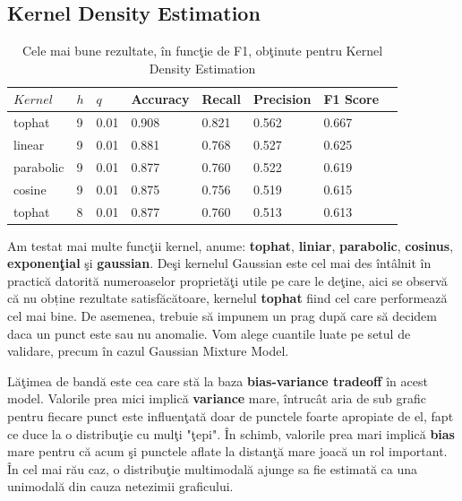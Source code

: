 \subsection{Kernel Density Estimation}

\begin{table}[H]
  \centering
  \begin{tabularx}{\textwidth}{
      |X
      |X
      |X
      |X
      |X
      |X
      |X
      |X|
  }
  \hline
  $Kernel$ & $h$ & $q$ & {Accuracy} & {Recall} & {Precision} & {F1 Score} \\
  \hline
  \rowcolor{gray!20} tophat	& 9	& 0.01 & 0.908 & 0.821 & 0.562 & 0.667  \\
  linear & 9 & 0.01	& 0.881 & 0.768	& 0.527 & 0.625 \\
  \rowcolor{gray!20} parabolic & 9 & 0.01 & 0.877 & 0.760 & 0.522 & 0.619  \\
  cosine & 9 & 0.01	& 0.875 & 0.756	& 0.519 & 0.615 \\
  \rowcolor{gray!20} tophat	& 8	& 0.01 & 0.877 & 0.760 & 0.513 & 0.613 \\
  \hline
  \end{tabularx}
  \caption{Cele mai bune rezultate, în funcţie de F1, obţinute pentru Kernel Density Estimation}
\end{table}

Am testat mai multe funcţii kernel, anume: \textbf{tophat}, 
\textbf{liniar}, \textbf{parabolic}, \textbf{cosinus},
\textbf{exponenţial} şi \textbf{gaussian}. 
Deşi kernelul Gaussian este cel mai des întâlnit în practică
datorită numeroaselor proprietăţi utile pe care le deţine, aici se observă
că nu obține rezultate satisfăcătoare, kernelul \textbf{tophat}
fiind cel care performează
cel mai bine. De asemenea, trebuie 
să impunem un prag după care să decidem daca un punct este sau nu anomalie. 
Vom alege cuantile luate pe setul de validare, precum în cazul 
Gaussian Mixture Model.

Lăţimea de bandă este cea care stă la baza \textbf{bias-variance tradeoff} 
în acest model.
Valorile prea mici implică \textbf{variance} mare, întrucât aria de sub grafic 
pentru fiecare punct este influenţată doar de punctele foarte apropiate de el, 
fapt ce duce la o distribuţie cu mulţi "ţepi". 
În schimb, valorile prea mari implică \textbf{bias} mare pentru că acum şi punctele 
aflate la distanţă mare joacă un rol important. În cel mai rău caz, o distribuţie 
multimodală ajunge sa fie estimată ca una unimodală din cauza netezimii graficului.

